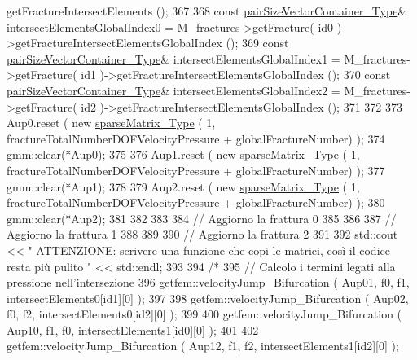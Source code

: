\begin{DoxyCode}
      getFractureIntersectElements ();
367 
368         \textcolor{keyword}{const} \hyperlink{Core_8h_a9bc476e433f99b82a9c2b8560735c7b5}{pairSizeVectorContainer\_Type}& intersectElementsGlobalIndex0 = 
      M\_fractures->getFracture( id0 )->getFractureIntersectElementsGlobalIndex ();
369         \textcolor{keyword}{const} \hyperlink{Core_8h_a9bc476e433f99b82a9c2b8560735c7b5}{pairSizeVectorContainer\_Type}& intersectElementsGlobalIndex1 = 
      M\_fractures->getFracture( id1 )->getFractureIntersectElementsGlobalIndex ();
370         \textcolor{keyword}{const} \hyperlink{Core_8h_a9bc476e433f99b82a9c2b8560735c7b5}{pairSizeVectorContainer\_Type}& intersectElementsGlobalIndex2 = 
      M\_fractures->getFracture( id2 )->getFractureIntersectElementsGlobalIndex ();
371 
372         
373         Aup0.reset ( \textcolor{keyword}{new} \hyperlink{Core_8h_afba9f623673e2ae32054015bdb5500f9}{sparseMatrix\_Type} ( 1, fractureTotalNumberDOFVelocityPressure + 
      globalFractureNumber) );
374         gmm::clear(*Aup0);
375 
376         Aup1.reset ( \textcolor{keyword}{new} \hyperlink{Core_8h_afba9f623673e2ae32054015bdb5500f9}{sparseMatrix\_Type} ( 1, fractureTotalNumberDOFVelocityPressure + 
      globalFractureNumber) );
377         gmm::clear(*Aup1);
378 
379         Aup2.reset ( \textcolor{keyword}{new} \hyperlink{Core_8h_afba9f623673e2ae32054015bdb5500f9}{sparseMatrix\_Type} ( 1, fractureTotalNumberDOFVelocityPressure + 
      globalFractureNumber) );
380         gmm::clear(*Aup2);
381         
382         
383         
384         \textcolor{comment}{// Aggiorno la frattura 0}
385 
386     
387         \textcolor{comment}{// Aggiorno la frattura 1}
388 
389         
390         \textcolor{comment}{// Aggiorno la frattura 2}
391 
392         std::cout << \textcolor{stringliteral}{" ATTENZIONE: scrivere una funzione che copi le matrici, così il codice resta più
       pulito "} << std::endl;
393         
394         \textcolor{comment}{/*}
395 \textcolor{comment}{        // Calcolo i termini legati alla pressione nell'intersezione}
396 \textcolor{comment}{        getfem::velocityJump\_Bifurcation ( Aup01, f0, f1, intersectElements0[id1][0] );}
397 \textcolor{comment}{        }
398 \textcolor{comment}{        getfem::velocityJump\_Bifurcation ( Aup02, f0, f2, intersectElements0[id2][0] );}
399 \textcolor{comment}{        }
400 \textcolor{comment}{        getfem::velocityJump\_Bifurcation ( Aup10, f1, f0, intersectElements1[id0][0] );}
401 \textcolor{comment}{        }
402 \textcolor{comment}{        getfem::velocityJump\_Bifurcation ( Aup12, f1, f2, intersectElements1[id2][0] );}

\end{DoxyCode}
